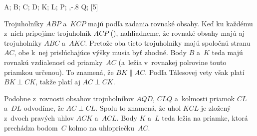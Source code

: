 {%
\fontplace
\tpoint A; \tpoint B; \lbpoint C; \rpoint D;
\lpoint K; \lBpoint L;
\rbpoint P; \bpoint{},-.8 Q;
[5] \hfil\Obr

Trojuholníky $ABP$ a~$KCP$ majú podľa zadania rovnaké obsahy.
Keď ku každému z~nich pripojíme trojuholník $ACP$ (\obr), nahliadneme, že
rovnaké obsahy majú aj trojuholníky $ABC$ a~$AKC$. Pretože oba tieto
trojuholníky majú spoločnú stranu~$AC$, obe k~nej prislúchajúce výšky musia byť
zhodné. Body $B$ a~$K$ teda majú rovnakú vzdialenosť od priamky~$AC$
(a~ležia v~rovnakej polrovine touto priamkou určenou). To
znamená, že $BK\parallel AC$. Podľa Tálesovej vety však platí
$BK\perp CK$, takže platí aj $AC\perp CK$.
\inspicture{}

Podobne z~rovnosti obsahov trojuholníkov $AQD$, $CLQ$ a~kolmosti priamok
$CL$ a~$DL$ odvodíme, že $AC\perp CL$. Spolu to znamená, že
uhol $KCL$ je zložený z~dvoch pravých uhlov $ACK$ 
a~$ACL$. Body $K$ a~$L$ teda ležia na priamke, ktorá prechádza
bodom~$C$ kolmo na uhlopriečku~$AC$.}

